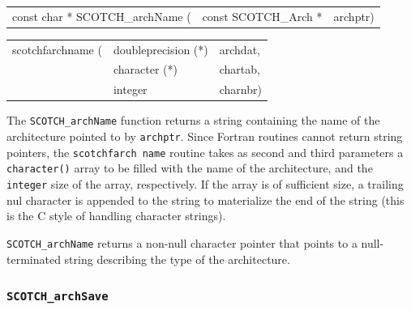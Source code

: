 \begin{itemize}
\progsyn

{\tt\begin{tabular}{l@{}ll}
const char * SCOTCH\_archName ( & const SCOTCH\_Arch * & archptr)
\end{tabular}}

{\tt\begin{tabular}{l@{}ll}
scotchfarchname ( & doubleprecision (*) & archdat, \\
                  & character (*)       & chartab, \\
                  & integer             & charnbr)
\end{tabular}}

\progdes

The {\tt SCOTCH\_archName} function returns a string containing the
name of the architecture pointed to by {\tt archptr}. Since Fortran
routines cannot return string pointers, the {\tt scotchf\lbt arch\lbt
name} routine takes as second and third parameters a {\tt character()}
array to be filled with the name of the architecture, and the {\tt
integer} size of the array, respectively. If the array is of
sufficient size, a trailing nul character is appended to the string to
materialize the end of the string (this is the C style of handling
character strings).

\progret

{\tt SCOTCH\_archName} returns a non-null character pointer that points
to a null-terminated string describing the type of the architecture.
\end{itemize}

\subsubsection{{\tt SCOTCH\_archSave}}

